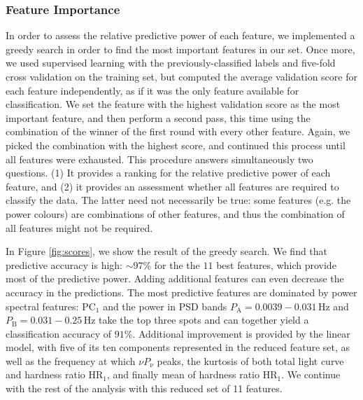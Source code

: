 \documentclass[12pt]{emulateapj}
\begin{document}
\subsubsection{Feature Importance}

In order to assess the relative predictive power of each feature, we implemented a greedy search in order to find the most important features in our set. 
Once more, we used supervised learning with the previously-classified labels and five-fold cross validation on the training set, but computed the average validation score for each feature independently, as if it was the only feature available for classification. We set the feature with the highest validation score as the most important feature, and then perform a second pass, this time using the combination of the winner of the first round with every other feature. Again, we picked the combination with the highest score, and continued this process until all features were exhausted. This procedure answers simultaneously two questions. (1) It provides a ranking for the relative predictive power of each feature, and (2) it provides an assessment whether all features are required to classify the data. The latter need not necessarily be true: some features (e.g. the power colours) are combinations of other features, and thus the combination of all features might not be required.

In Figure \ref{fig:scores}, we show the result of the greedy search. We find that predictive accuracy is high: $\sim\!\! 97\%$ for the the $11$ best features, which provide most of the predictive power. Adding additional features can even decrease the accuracy in the predictions. The most predictive features are dominated by power spectral features: $\mathrm{PC}_1$ and the power in PSD bands  $P_\mathrm{A} = 0.0039-0.031 \,\mathrm{Hz}$ and $P_\mathrm{B} = 0.031-0.25 \,\mathrm{Hz}$ take the top three spots and can together yield a classification accuracy of $91\%$. Additional improvement is provided by the linear model, with five of its ten components represented in the reduced feature set, as well as the frequency at which $\nu P_\nu$ peaks, the kurtosis of both total light curve and hardness ratio $\mathrm{HR}_1$, and finally mean of hardness ratio $\mathrm{HR}_1$. We continue with the rest of the analysis with this reduced set of 11 features.


%
%
\end{document}
